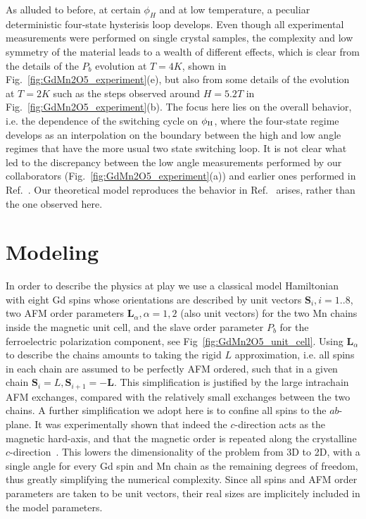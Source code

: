 As alluded to before, at certain $\phi_H$ and at low temperature, a peculiar deterministic four-state hysterisis loop develops.
Even though all experimental measurements were performed on single crystal samples, the complexity and low symmetry of the material leads to a wealth of different effects, which is clear from the details of the $P_b$ evolution at $T=4K$, shown in Fig.~\ref{fig:GdMn2O5_experiment}(e), but also from some details of the evolution at $T=2K$ such as the steps observed around $H=5.2T$ in Fig.~\ref{fig:GdMn2O5_experiment}(b).
The focus here lies on the overall behavior, i.e. the dependence of the switching cycle on $\phi_{\rm H}$, where the four-state regime develops as an interpolation on the boundary between the high and low angle regimes that have the more usual two state switching loop.
It is not clear what led to the discrepancy between the low angle measurements performed by our collaborators (Fig.~\ref{fig:GdMn2O5_experiment}(a)) and earlier ones performed in Ref.~\cite{Lee13}.
Our theoretical model reproduces the behavior in Ref.~\cite{Lee13} arises, rather than the one observed here.

\section{Modeling}
In order to describe the physics at play we use a classical model Hamiltonian with eight Gd spins whose orientations are described by unit vectors $\bm{S}_i, i=1..8$, two AFM order parameters $\bm{L}_\alpha, \alpha=1,2$ (also unit vectors) for the two Mn chains inside the magnetic unit cell, and the slave order parameter $P_b$ for the ferroelectric polarization component, see Fig~\ref{fig:GdMn2O5_unit_cell}.
Using $\bm{L}_\alpha$ to describe the chains amounts to taking the rigid $L$ approximation, i.e. all spins in each chain are assumed to be perfectly AFM ordered, such that in a given chain $\bm{S}_i = L, \bm{S}_{i+1} = - \bm{L}$.
This simplification is justified by the large intrachain AFM exchanges, compared with the relatively small exchanges between the two chains.
A further simplification we adopt here is to confine all spins to the $ab$-plane. It was experimentally shown that indeed the $c$-direction acts as the magnetic hard-axis, and that the magnetic order is repeated along the crystalline $c$-direction~\cite{Lee13}.
This lowers the dimensionality of the problem from 3D to 2D, with a single angle for every Gd spin and Mn chain as the remaining degrees of freedom, thus greatly simplifying the numerical complexity.
Since all spins and AFM order parameters are taken to be unit vectors, their real sizes are implicitely included in the model parameters.

